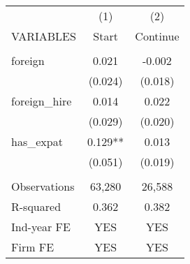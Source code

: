 \begin{tabular}{lcc} \hline
 & (1) & (2) \\
VARIABLES & Start & Continue \\ \hline
 &  &  \\
foreign & 0.021 & -0.002 \\
 & (0.024) & (0.018) \\
foreign\_hire & 0.014 & 0.022 \\
 & (0.029) & (0.020) \\
has\_expat & 0.129** & 0.013 \\
 & (0.051) & (0.019) \\
 &  &  \\
Observations & 63,280 & 26,588 \\
R-squared & 0.362 & 0.382 \\
Ind-year FE & YES & YES \\
 Firm FE & YES & YES \\ \hline
\end{tabular}
